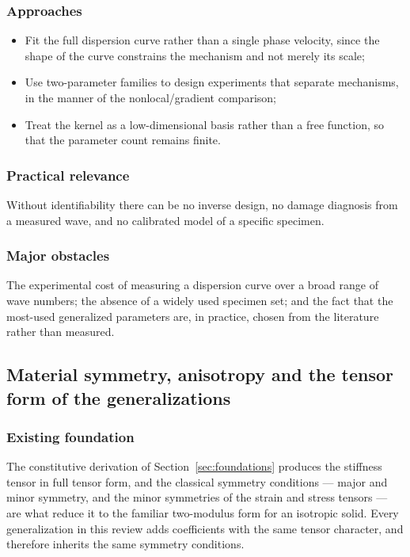 \subsubsection{Approaches}

\begin{itemize}
\item Fit the full dispersion curve rather than a single phase velocity, since the shape of the curve constrains the mechanism and not merely its scale;
\item Use two-parameter families to design experiments that separate mechanisms, in the manner of the nonlocal/gradient comparison;
\item Treat the kernel as a low-dimensional basis rather than a free function, so that the parameter count remains finite.
\end{itemize}

\subsubsection{Practical relevance}

Without identifiability there can be no inverse design, no damage diagnosis from a measured wave, and no calibrated model of a specific specimen.

\subsubsection{Major obstacles}

The experimental cost of measuring a dispersion curve over a broad range of wave numbers; the absence of a widely used specimen set; and the fact that the most-used generalized parameters are, in practice, chosen from the literature rather than measured.

\subsection{Material symmetry, anisotropy and the tensor form of the generalizations}
\label{sec:15.9}

\subsubsection{Existing foundation}

The constitutive derivation of Section~\ref{sec:foundations} produces the stiffness tensor in full tensor form, and the classical symmetry conditions --- major and minor symmetry, and the minor symmetries of the strain and stress tensors --- are what reduce it to the familiar two-modulus form for an isotropic solid. Every generalization in this review adds coefficients with the same tensor character, and therefore inherits the same symmetry conditions.

